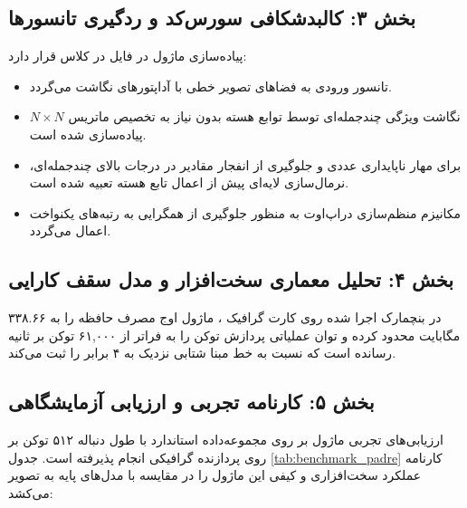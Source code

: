 \subsection*{بخش ۳: کالبدشکافی سورس‌کد و ردگیری تانسورها }
پیاده‌سازی ماژول در فایل  در کلاس  قرار دارد:
\begin{itemize}
    \item تانسور ورودی \lr{$[B, N, D]$} به فضاهای تصویر خطی با آداپتورهای  نگاشت می‌گردد.
    \item نگاشت ویژگی چندجمله‌ای توسط توابع هسته بدون نیاز به تخصیص ماتریس $N \times N$ پیاده‌سازی شده است.
    \item برای مهار ناپایداری عددی و جلوگیری از انفجار مقادیر در درجات بالای چندجمله‌ای، نرمال‌سازی لایه‌ای  پیش از اعمال تابع هسته تعبیه شده است.
    \item مکانیزم منظم‌سازی دراپ‌اوت به منظور جلوگیری از همگرایی به رتبه‌های یکنواخت اعمال می‌گردد.
\end{itemize}

\subsection*{بخش ۴: تحلیل معماری سخت‌افزار و مدل سقف کارایی }
در بنچمارک اجرا شده روی کارت گرافیک ، ماژول  اوج مصرف حافظه را به ۳۳۸.۶۶ مگابایت محدود کرده و توان عملیاتی پردازش توکن را به فراتر از ۶۱,۰۰۰ توکن بر ثانیه رسانده است که نسبت به خط مبنا شتابی نزدیک به ۴ برابر را ثبت می‌کند.

\subsection*{بخش ۵: کارنامه تجربی و ارزیابی آزمایشگاهی }
ارزیابی‌های تجربی ماژول  بر روی مجموعه‌داده استاندارد  با طول دنباله ۵۱۲ توکن بر روی پردازنده گرافیکی  انجام پذیرفته است. جدول \ref{tab:benchmark_padre} کارنامه عملکرد سخت‌افزاری و کیفی این ماژول را در مقایسه با مدل‌های پایه به تصویر می‌کشد:

